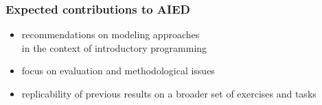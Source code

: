 \documentclass[bigger]{beamer}
\begin{document}
%
%
%
%


\begin{frame}
  \frametitle{Expected contributions to AIED}
  \begin{itemize}

  \item recommendations on modeling approaches\\
        in the context of introductory programming
  \item focus on evaluation and methodological issues
  \item replicability of previous results on a broader set of exercises and tasks
  \end{itemize}
\end{frame}
\end{document}
